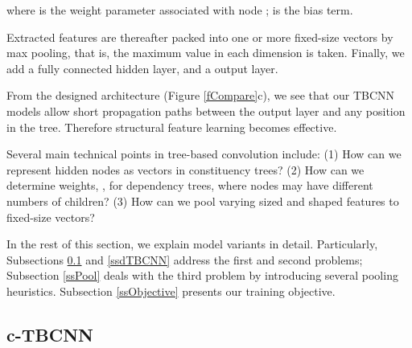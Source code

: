 \documentclass[11pt,a4paper]{article}
\begin{document}
\vspace{-.3cm}

\vspace{-.3cm}


\noindent where  is the weight parameter associated with
node ;  is the bias term.


Extracted features are thereafter packed into one or more fixed-size vectors by max pooling, that is, the maximum value in each dimension is taken.
Finally, we add a fully connected hidden layer, and a  output layer.

From the designed architecture (Figure \ref{fCompare}c), we see that our TBCNN models allow short
propagation paths between the output layer and any position in the tree.
Therefore structural feature learning becomes effective.

Several main technical points in tree-based convolution include:
(1) How can we represent hidden nodes as vectors in constituency trees?
(2) How can we determine weights, , for dependency trees, where nodes
may have different numbers of children?
(3) How can we pool varying sized and shaped features to fixed-size vectors?

In the rest of this section, we explain model variants in detail.
Particularly, Subsections \ref{sscTBCNN} and \ref{ssdTBCNN} address the first and second problems;
Subsection \ref{ssPool} deals with the third problem by introducing several pooling heuristics.
Subsection \ref{ssObjective} presents our training objective.
\subsection{c-TBCNN}\label{sscTBCNN}
\end{document}
